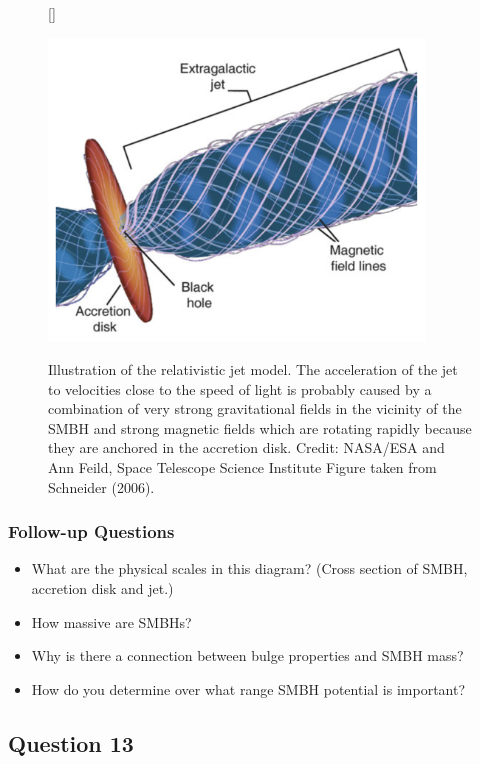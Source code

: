 \documentclass[a4paper,11pt]{article}
\begin{document}
\begin{figure}[h]
    [\FBwidth]
    {\caption{\footnotesize{Illustration of the relativistic jet model. The acceleration of the jet to velocities close to the speed of light is probably caused by a combination of very strong gravitational fields in the vicinity of the SMBH and strong magnetic fields which are rotating rapidly because they are anchored in the accretion disk. Credit: NASA/ESA and Ann Feild, Space Telescope Science Institute Figure taken from Schneider (2006).}}
    \label{fig:agnjet}}
    {\includegraphics[width=10cm]{figures/AGN_jet.png}}
\end{figure}

\subsubsection{Follow-up Questions}

\begin{itemize}
    \item What are the physical scales in this diagram? (Cross section of SMBH, accretion disk and jet.)
    \item How massive are SMBHs?
    \item Why is there a connection between bulge properties and SMBH mass?
    \item How do you determine over what range SMBH potential is important?
\end{itemize}



\newpage
\subsection{Question 13}
\end{document}
